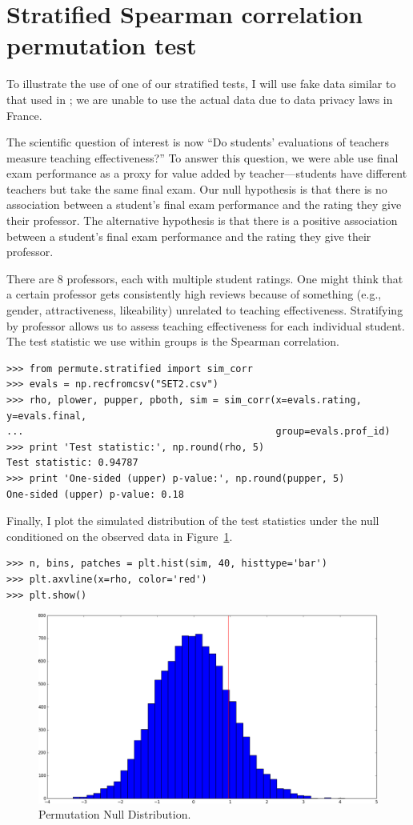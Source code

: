 \section*{Stratified Spearman correlation permutation test}

To illustrate the use of one of our stratified tests, I will use fake
data similar to that used in \cite{boring2015}; we are unable to use
the actual data due to data privacy laws in France.

The scientific question of interest is now ``Do students' evaluations of
teachers measure teaching effectiveness?''  To answer this question, we were
able use final exam performance as a proxy for value added by
teacher---students have different teachers but take the same final exam.
Our null hypothesis is that there is no association between a student's final
exam performance and the rating they give their professor.  The alternative
hypothesis is that there is a positive association between a student's final
exam performance and the rating they give their professor.

There are 8 professors, each with multiple student ratings.  One might think
that a certain professor gets consistently high reviews because of something (e.g.,
gender, attractiveness, likeability) unrelated to teaching effectiveness.
Stratifying by professor allows us to assess teaching effectiveness for each
individual student.  The test statistic we use within groups is the Spearman
correlation.

\begin{verbatim}
>>> from permute.stratified import sim_corr
>>> evals = np.recfromcsv("SET2.csv")
>>> rho, plower, pupper, pboth, sim = sim_corr(x=evals.rating, y=evals.final,
...                                            group=evals.prof_id)
>>> print 'Test statistic:', np.round(rho, 5)
Test statistic: 0.94787
>>> print 'One-sided (upper) p-value:', np.round(pupper, 5)
One-sided (upper) p-value: 0.18
\end{verbatim}

Finally, I plot the simulated distribution of the test statistics under the null
conditioned on the observed data in Figure~\ref{fig:figure2}.

\begin{verbatim}
>>> n, bins, patches = plt.hist(sim, 40, histtype='bar')
>>> plt.axvline(x=rho, color='red')
>>> plt.show()
\end{verbatim}

\begin{figure}
  \begin{centering}
    \includegraphics[width=.8\textwidth]{fig/figure_2.png}\par
  \end{centering}

  \caption{\label{fig:figure2}Permutation Null Distribution.}

\end{figure}


